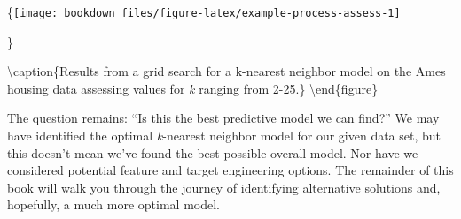 \documentclass[]{krantz}
\begin{document}
\{\centering \texttt{[image: bookdown\_files/figure-latex/example-process-assess-1]}

\}

\textbackslash{}caption\{Results from a grid search for a k-nearest neighbor model on the Ames housing data assessing values for \emph{k} ranging from 2-25.\}\label{fig:example-process-assess}
\textbackslash{}end\{figure\}

The question remains: ``Is this the best predictive model we can find?'' We may have identified the optimal \emph{k}-nearest neighbor model for our given data set, but this doesn't mean we've found the best possible overall model. Nor have we considered potential feature and target engineering options. The remainder of this book will walk you through the journey of identifying alternative solutions and, hopefully, a much more optimal model.



\backmatter
\printindex
\end{document}
